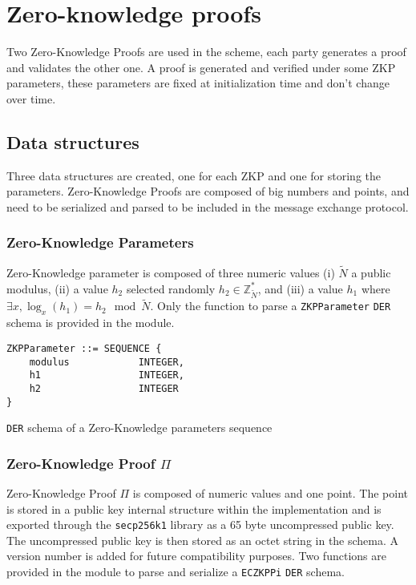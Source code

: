 
\section{Zero-knowledge proofs}

Two Zero-Knowledge Proofs are used in the scheme, each party generates a proof
and validates the other one. A proof is generated and verified under some ZKP
parameters, these parameters are fixed at initialization time and don't
change over time.

\subsection{Data structures}

Three data structures are created, one for each ZKP and one for storing the
parameters. Zero-Knowledge Proofs are composed of big numbers and points, and
need to be serialized and parsed to be included in the message exchange
protocol.

\subsubsection{Zero-Knowledge Parameters}

Zero-Knowledge parameter is composed of three numeric values (i) $\tilde{N}$ a
public modulus, (ii) a value $h_2$ selected randomly $h_2 \in
\mathbb{Z}_{\tilde{N}}^*$, and (iii) a value $h_1$ where $\exists x, \log_x(h_1) =
h_2 \mod \tilde{N}$. Only the function to parse a \texttt{ZKPParameter}
\texttt{DER} schema is provided in the module.

\begin{listing}
  \begin{verbatim}
ZKPParameter ::= SEQUENCE {
    modulus            INTEGER,
    h1                 INTEGER,
    h2                 INTEGER
}
  \end{verbatim}
	\caption{\texttt{DER} schema of a Zero-Knowledge parameters sequence}
	\label{lst:DERSchemaZKPParams}
\end{listing}

\subsubsection{Zero-Knowledge Proof $\Pi$}

Zero-Knowledge Proof $\Pi$ is composed of numeric values and one point. The
point is stored in a public key internal structure within the implementation and
is exported through the \texttt{secp256k1} library as a 65 byte uncompressed public key.
The uncompressed public key is then stored as an octet string in the schema. A
version number is added for future compatibility purposes. Two functions are
provided in the module to parse and serialize a \texttt{ECZKPPi} \texttt{DER}
schema.

